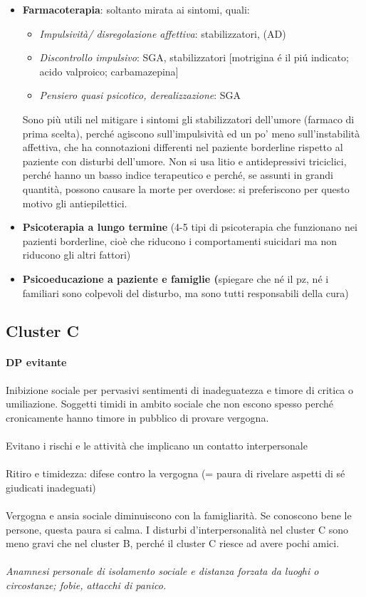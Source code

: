 \begin{itemize}
\item
  \textbf{Farmacoterapia}: soltanto mirata ai sintomi, quali:
\begin{itemize}
\item
  \emph{Impulsività/ disregolazione affettiva}: stabilizzatori, (AD)
\item
  \emph{Discontrollo impulsivo}: SGA, stabilizzatori {[}motrigina é il
  piú indicato; acido valproico; carbamazepina{]}
\item
  \emph{Pensiero quasi psicotico, derealizzazione}: SGA
\end{itemize}

Sono più utili nel mitigare i sintomi gli stabilizzatori dell'umore
(farmaco di prima scelta), perché agiscono sull'impulsività ed un po'
meno sull'instabilità affettiva, che ha connotazioni differenti nel
paziente borderline rispetto al paziente con disturbi dell'umore. Non si
usa litio e antidepressivi triciclici, perché hanno un basso indice
terapeutico e perché, se assunti in grandi quantità, possono causare la
morte per overdose: si preferiscono per questo motivo gli
antiepilettici.

\item
  \textbf{Psicoterapia a lungo termine} (4-5 tipi di psicoterapia che
  funzionano nei pazienti borderline, cioè che riducono i comportamenti
  suicidari ma non riducono gli altri fattori)
\item
  \textbf{Psicoeducazione a paziente e famiglie (}spiegare che né il pz,
  né i familiari sono colpevoli del disturbo, ma sono tutti responsabili
  della cura)
\end{itemize}

\subsection{Cluster C}

\paragraph{DP evitante}

Inibizione sociale per pervasivi sentimenti di inadeguatezza e timore di
critica o umiliazione. Soggetti timidi in ambito sociale che non escono
spesso perché cronicamente hanno timore in pubblico di provare vergogna.
\\\\
Evitano i rischi e le attività che implicano un contatto interpersonale
\\\\
Ritiro e timidezza: difese contro la vergogna (= paura di rivelare
aspetti di sé giudicati inadeguati)
\\\\
Vergogna e ansia sociale diminuiscono con la famigliarità. Se conoscono
bene le persone, questa paura si calma. I disturbi d'interpersonalità
nel cluster C sono meno gravi che nel cluster B, perché il cluster C
riesce ad avere pochi amici.
\\\\
\emph{\emph{Anamnesi personale di isolamento sociale e distanza forzata
da luoghi o circostanze; fobie, attacchi di panico. }}

